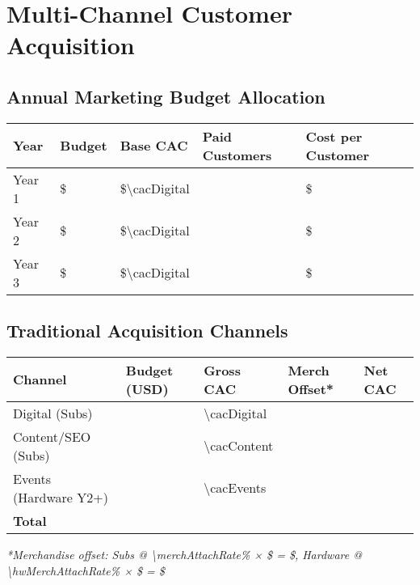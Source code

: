 
\section{Multi-Channel Customer Acquisition}

\subsection{Annual Marketing Budget Allocation}
\begin{table}[H]
\centering
\begin{tabularx}{\linewidth}{l Y Y Y Y}
\toprule
Year & Budget & Base CAC & Paid Customers & Cost per Customer \\\midrule
Year 1 & \$\numint{\marketingBudgetYearOne} & \$\num{\cacDigital} & \numint{\baseNewSubsYearOne} & \$\numint{\cacDigital} \\
Year 2 & \$\numint{\marketingBudgetYearTwo} & \$\num{\cacDigital} & \numint{\baseNewSubsYearTwo} & \$\numint{\cacDigital} \\
Year 3 & \$\numint{\marketingBudgetYearThree} & \$\num{\cacDigital} & \numint{\baseNewSubsYearThree} & \$\numint{\cacDigital} \\
\bottomrule
\end{tabularx}
\end{table}

\subsection{Traditional Acquisition Channels}
\begin{table}[H]
\centering
\begin{tabularx}{\linewidth}{l Y Y Y Y}
\toprule
Channel & Budget (USD) & Gross CAC\cite{authoranalysis2024} & Merch Offset* & Net CAC \\\midrule
Digital (Subs) & \numint{\budgetDigital} & \num{\cacDigital} & \numfpeval{\merchOffsetSubsCalc} & \numfpeval{\cacDigital - \merchOffsetSubsCalc} \\
Content/SEO (Subs) & \numint{\budgetContent} & \num{\cacContent} & \numfpeval{\merchOffsetSubsCalc} & \numfpeval{\cacContent - \merchOffsetSubsCalc} \\
Events (Hardware Y2+) & \numint{\budgetEvents} & \num{\cacEvents} & \numfpeval{\merchOffsetHwCalc} & \numfpeval{\cacEvents - \merchOffsetHwCalc} \\\midrule
\textbf{Total} & \textbf{} &  &  &  \\
\bottomrule
\end{tabularx}
\end{table}
\textit{*Merchandise offset: Subs @ \num{\merchAttachRate}\% × \$\numfpeval{\merchAvgProfit} = \$\numfpeval{\merchOffsetSubsCalc}, Hardware @ \num{\hwMerchAttachRate}\% × \$\numfpeval{\merchAvgProfit} = \$\numfpeval{\merchOffsetHwCalc}}

